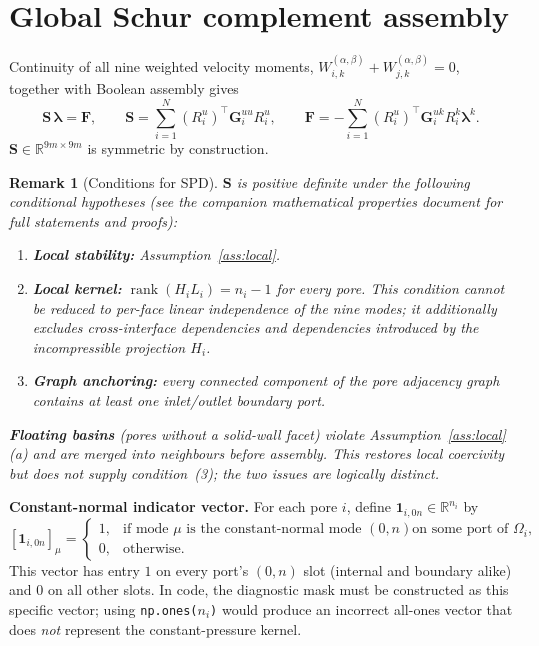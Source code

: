 \documentclass[11pt,a4paper]{article}
\newtheorem{remark}{Remark}
\newcommand{\R}{\mathbb{R}}
\newcommand{\pore}[1]{\Omega_{#1}}
\newcommand{\trac}{\bm{\lambda}}
\newcommand{\DtN}{\mathbf{G}}
\newcommand{\Schur}{\mathbf{S}}
\newcommand{\one}{\mathbf{1}}
\newcommand{\rank}{\operatorname{rank}}
\begin{document}
\section{Global Schur complement assembly}

Continuity of all nine weighted velocity moments,
$W_{i,k}^{(\alpha,\beta)} + W_{j,k}^{(\alpha,\beta)} = 0$, together with
Boolean assembly gives
\begin{equation}\label{eq:schur}
  \Schur\,\trac = \bm{F},\qquad
  \Schur = \sum_{i=1}^N (R_i^u)^\top \DtN_i^{uu} R_i^u,\qquad
  \bm{F} = -\sum_{i=1}^N (R_i^u)^\top \DtN_i^{uk} R_i^k \trac^k.
\end{equation}
$\Schur \in \R^{9m\times 9m}$ is symmetric by construction.

\begin{remark}[Conditions for SPD]\label{rem:spd}
  $\Schur$ is positive definite under the following \emph{conditional}
  hypotheses (see the companion mathematical properties document for
  full statements and proofs):
  \begin{enumerate}[nosep,leftmargin=*]
    \item \textbf{Local stability:} Assumption~\ref{ass:local}.
    \item \textbf{Local kernel:} $\rank(H_i L_i) = n_i-1$ for every pore.
      This condition cannot be reduced to per-face linear independence
      of the nine modes; it additionally excludes cross-interface
      dependencies and dependencies introduced by the incompressible
      projection $H_i$.
    \item \textbf{Graph anchoring:} every connected component of the pore
      adjacency graph contains at least one inlet/outlet boundary port.
  \end{enumerate}
  \textbf{Floating basins} (pores without a solid-wall facet) violate
  Assumption~\ref{ass:local}(a) and are merged into neighbours before
  assembly.  This restores local coercivity but does \emph{not} supply
  condition~(3); the two issues are logically distinct.
\end{remark}

\medskip\noindent
\textbf{Constant-normal indicator vector.}
For each pore $i$, define $\one_{i,0n} \in \R^{n_i}$ by
\[
  [\one_{i,0n}]_\mu =
  \begin{cases}
    1, & \text{if mode $\mu$ is the constant-normal mode $(0,n)$
         on some port of $\pore{i}$},\\
    0, & \text{otherwise}.
  \end{cases}
\]
This vector has entry $1$ on every port's $(0,n)$ slot (internal and
boundary alike) and $0$ on all other slots.  In code, the diagnostic
mask must be constructed as this specific vector; using
\texttt{np.ones(}$n_i$\texttt{)} would produce an incorrect all-ones
vector that does \emph{not} represent the constant-pressure kernel.
\end{document}
